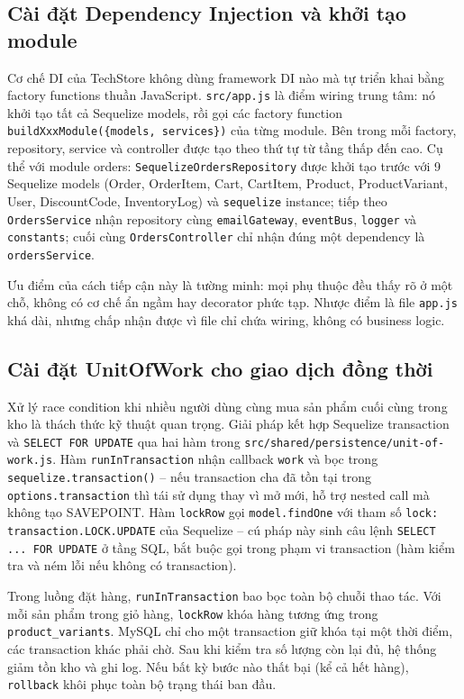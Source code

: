 \subsection{Cài đặt Dependency Injection và khởi tạo module}

Cơ chế DI của TechStore không dùng framework DI nào mà tự triển khai bằng factory functions thuần JavaScript. \texttt{src/app.js} là điểm wiring trung tâm: nó khởi tạo tất cả Sequelize models, rồi gọi các factory function \texttt{buildXxxModule(\{models, services\})} của từng module. Bên trong mỗi factory, repository, service và controller được tạo theo thứ tự từ tầng thấp đến cao. Cụ thể với module orders: \texttt{SequelizeOrdersRepository} được khởi tạo trước với 9 Sequelize models (Order, OrderItem, Cart, CartItem, Product, ProductVariant, User, DiscountCode, InventoryLog) và \texttt{sequelize} instance; tiếp theo \texttt{OrdersService} nhận repository cùng \texttt{emailGateway}, \texttt{eventBus}, \texttt{logger} và \texttt{constants}; cuối cùng \texttt{OrdersController} chỉ nhận đúng một dependency là \texttt{ordersService}.

Ưu điểm của cách tiếp cận này là tường minh: mọi phụ thuộc đều thấy rõ ở một chỗ, không có cơ chế ẩn ngầm hay decorator phức tạp. Nhược điểm là file \texttt{app.js} khá dài, nhưng chấp nhận được vì file chỉ chứa wiring, không có business logic.

\subsection{Cài đặt UnitOfWork cho giao dịch đồng thời}

Xử lý race condition khi nhiều người dùng cùng mua sản phẩm cuối cùng trong kho là thách thức kỹ thuật quan trọng. Giải pháp kết hợp Sequelize transaction và \texttt{SELECT FOR UPDATE} qua hai hàm trong \texttt{src/shared/persistence/unit-of-work.js}. Hàm \texttt{runInTransaction} nhận callback \texttt{work} và bọc trong \texttt{sequelize.transaction()} -- nếu transaction cha đã tồn tại trong \texttt{options.transaction} thì tái sử dụng thay vì mở mới, hỗ trợ nested call mà không tạo SAVEPOINT. Hàm \texttt{lockRow} gọi \texttt{model.findOne} với tham số \texttt{lock: transaction.LOCK.UPDATE} của Sequelize -- cú pháp này sinh câu lệnh \texttt{SELECT ... FOR UPDATE} ở tầng SQL, bắt buộc gọi trong phạm vi transaction (hàm kiểm tra và ném lỗi nếu không có transaction).

Trong luồng đặt hàng, \texttt{runInTransaction} bao bọc toàn bộ chuỗi thao tác. Với mỗi sản phẩm trong giỏ hàng, \texttt{lockRow} khóa hàng tương ứng trong \texttt{product\_variants}. MySQL chỉ cho một transaction giữ khóa tại một thời điểm, các transaction khác phải chờ. Sau khi kiểm tra số lượng còn lại đủ, hệ thống giảm tồn kho và ghi log. Nếu bất kỳ bước nào thất bại (kể cả hết hàng), \texttt{rollback} khôi phục toàn bộ trạng thái ban đầu.

